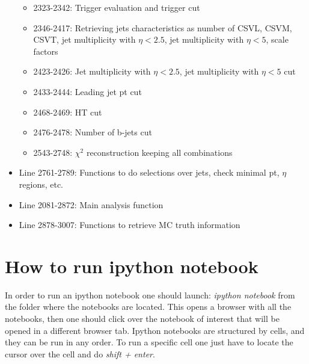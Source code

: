 \documentclass[11pt,a4paper]{article}
\begin{document}
\begin{itemize}
  \begin{itemize}
  \item 2323-2342: Trigger evaluation and trigger cut
  \item 2346-2417: Retrieving jets characteristics as number of CSVL, CSVM, CSVT, jet multiplicity with $\eta<2.5$, jet multiplicity with $\eta<5$, scale factors
  \item 2423-2426: Jet multiplicity with $\eta<2.5$, jet multiplicity with $\eta<5$ cut
  \item 2433-2444: Leading jet pt cut
  \item 2468-2469: HT cut
  \item 2476-2478: Number of b-jets cut
  \item 2543-2748: $\chi^{2}$ reconstruction keeping all combinations
  \end{itemize}
\item Line 2761-2789: Functions to do selections over jets, check minimal pt, $\eta$ regions, etc.
\item Line 2081-2872: Main analysis function
\item Line 2878-3007: Functions to retrieve MC truth information
\end{itemize}

\section*{How to run ipython notebook}

In order to run an ipython notebook one should launch: \textit{ipython notebook} from the folder where the notebooks are located. This opens a browser with all the notebooks, then one should click over the notebook of interest that will be opened in a different browser tab. Ipython notebooks are structured by cells, and they can be run in any order. To run a specific cell one just have to locate the cursor over the cell and do \textit{shift + enter}.  
\end{document}
